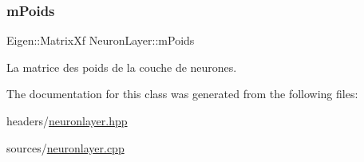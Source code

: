 \mbox{\label{classNeuronLayer_ab6aaf5dc22c97ba46db5ac5e8715ed8f}} 
\subsubsection{\texorpdfstring{m\+Poids}{mPoids}}
{\footnotesize\ttfamily Eigen\+::\+Matrix\+Xf Neuron\+Layer\+::m\+Poids\hspace{0.3cm}{\ttfamily [private]}}



La matrice des poids de la couche de neurones. 



The documentation for this class was generated from the following files\+:\begin{DoxyCompactItemize}
\item 
headers/\hyperlink{neuronlayer_8hpp}{neuronlayer.\+hpp}\item 
sources/\hyperlink{neuronlayer_8cpp}{neuronlayer.\+cpp}\end{DoxyCompactItemize}

